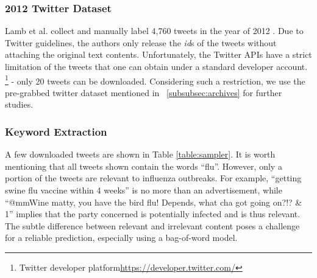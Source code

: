 \documentclass[12pt, oneside]{article}
\begin{document}
\subsubsection{2012 Twitter Dataset}
Lamb et al. \cite{lamb-paul-dredze-naacl-2013} collect and manually label 4,760 tweets in the year of 2012 \cite{lamb-paul-dredze-naacl-2013}.
Due to Twitter guidelines, the authors only release the \textit{id}s of the tweets without attaching the original text contents.
Unfortunately, the Twitter APIs have a strict limitation of the tweets that one can obtain under a standard developer account.
\footnote{Twitter developer platform\url{https://developer.twitter.com/}} - only 20 tweets can be downloaded.
Considering such a restriction, we use the pre-grabbed twitter dataset mentioned in ~\ref{subsubsec:archives} for further studies.

\subsubsection{Keyword Extraction}
A few downloaded tweets are shown in Table \ref{table:sampler}. It is worth mentioning that all tweets shown contain the words ``flu''.
However, only a portion of the tweets are relevant to influenza outbreaks. For example, ``getting swine flu vaccine within 4 weeks'' is no more than an advertisement,
while ``@mmWine matty, you have the bird flu! Depends, what cha got going on?!? \& 1'' implies that the party concerned is potentially infected and is thus relevant.
The subtle difference between relevant and irrelevant content poses a challenge for a reliable prediction, especially using a bag-of-word model.
\end{document}
